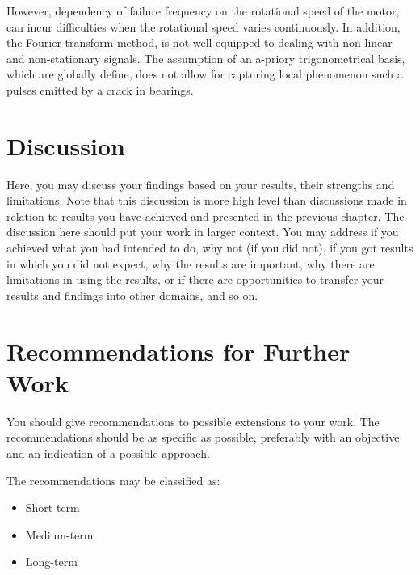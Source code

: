 \documentclass[thesis.tex]{subfiles}
\begin{document}
\justify
However, dependency of failure frequency on the rotational speed of the motor, can incur difficulties when the rotational speed varies continuously. In addition, the Fourier transform method, is not well equipped to dealing with non-linear and non-stationary signals. The assumption of an a-priory trigonometrical basis, which are globally define, does not allow for capturing local phenomenon such a pulses emitted by a crack in bearings. 
\section{Discussion}
\label{sec:discussion}
Here, you may discuss your findings based on your results, their strengths and limitations. 
Note that this discussion is more high level than discussions made in relation to results you have achieved and presented in the previous chapter. 
The discussion here should put your work in larger context. 
You may address if you achieved what you had intended to do, why not (if you did not), if you got results in which you did not expect, why the results are important, why there are limitations in using the results, or if there are opportunities to transfer your results and findings into other domains, and so on.
\section{Recommendations for Further Work}
\label{sec:recommendations_for_further_work}
You should give recommendations to possible extensions to your work. 
The recommendations should be as specific as possible, preferably with an objective and an indication of a possible approach.

The recommendations may be classified as:
\begin{itemize}
\item Short-term
\item Medium-term
\item Long-term
\end{itemize}
\end{document}
